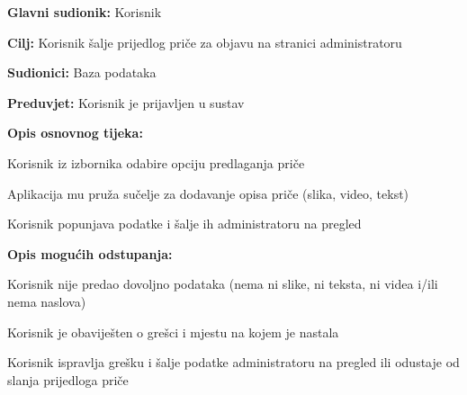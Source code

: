 						\noindent {}
					\begin{packed_item}
						
						\item \textbf{Glavni sudionik: }Korisnik
						\item  \textbf{Cilj:} Korisnik šalje prijedlog priče za objavu na stranici administratoru 
						\item  \textbf{Sudionici:} Baza podataka
						\item  \textbf{Preduvjet:} Korisnik je prijavljen u sustav
						\item  \textbf{Opis osnovnog tijeka:}
						
						\item[] \begin{packed_enum}
							
							\item Korisnik iz izbornika odabire opciju predlaganja priče
							\item Aplikacija mu pruža sučelje za dodavanje opisa priče (slika, video, tekst)
							\item Korisnik popunjava podatke i šalje ih administratoru na pregled
						\end{packed_enum}
						
						\item  \textbf{Opis mogućih odstupanja:}
						
						\item[] \begin{packed_item}
							
							\item[2.a] Korisnik nije predao dovoljno podataka (nema ni slike, ni teksta, ni videa i/ili nema naslova) 
							\item[] \begin{packed_enum}
								
								\item Korisnik je obaviješten o grešci i mjestu na kojem je nastala
								\item Korisnik ispravlja grešku i šalje podatke administratoru na pregled ili odustaje od slanja prijedloga priče								
							\end{packed_enum}			
						\end{packed_item}
					\end{packed_item}
				

